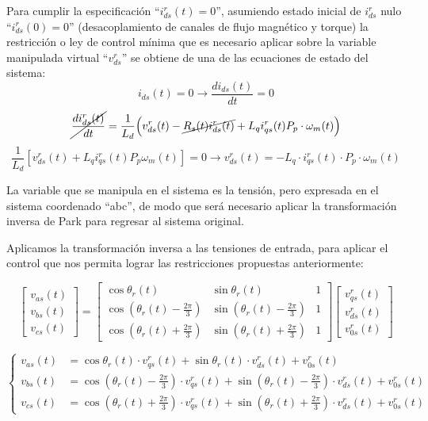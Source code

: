 \documentclass{article}
\begin{document}
Para cumplir la especificación ``$i^r_{ds}(t) = 0$'', asumiendo estado inicial de \(i^r_{ds}\) nulo ``$i^r_{ds}(0) = 0$'' (desacoplamiento de canales de flujo magnético y torque) la restricción o ley de control mínima que es necesario aplicar sobre la variable manipulada virtual ``$v^r_{ds}$'' se obtiene de una de las ecuaciones de estado del sistema:
\begin{equation}
i_{ds}(t) =  0 \rightarrow \frac{di_{ds}(t)}{dt} = 0
\end{equation}
\begin{equation}
\cancel{\frac{d i_{ds}^r(t)}{dt}} = \frac{1}{L_d} \Big( v_{ds}^r(t) - \cancel{R_s(t) i_{ds}^r(t)} + L_q i_{qs}^r(t) P_p \cdot \omega_m(t) \Big)
\label{eq:ExpresionIds}
\end{equation}
\begin{equation}
\frac{1}{L_d}\left[v^r_{ds}(t) + L_qi^r_{qs}(t)P_p\omega_m(t)\right] = 0 \rightarrow v^r_{ds}(t) = -L_q\cdot i^r_{qs}(t)\cdot P_p\cdot\omega_m(t)
\end{equation}

La variable que se manipula en el sistema es la tensión, pero expresada en el sistema coordenado ``abc'', de modo que será necesario aplicar la transformación inversa de Park para regresar al sistema original.

Aplicamos la transformación inversa a las tensiones de entrada, para aplicar el control que nos permita lograr las restricciones propuestas anteriormente:

\begin{equation}
\begin{bmatrix}
v_{as}(t) \\
v_{bs}(t) \\
v_{cs}(t)
\end{bmatrix} = 
\begin{bmatrix}
\cos \theta_r(t) & \sin \theta_r(t) & 1 \\
\cos(\theta_r(t)-\frac{2\pi}{3}) & \sin(\theta_r(t)-\frac{2\pi}{3}) & 1 \\
\cos(\theta_r(t)+\frac{2\pi}{3}) & \sin(\theta_r(t)+\frac{2\pi}{3}) & 1
\end{bmatrix}
\begin{bmatrix}
v^r_{qs}(t) \\
v^r_{ds}(t) \\
v^r_{0s}(t)
\end{bmatrix}
\label{Ec.37}
\end{equation}

\begin{equation}
\begin{cases}
v_{as}(t) &= \cos \theta_r(t)\cdot v^r_{qs}(t) + \sin \theta_r(t)\cdot v^r_{ds}(t) + v^r_{0s}(t) \\
v_{bs}(t) &= \cos\left(\theta_r(t)-\frac{2\pi}{3}\right)\cdot v^r_{qs}(t) + \sin\left(\theta_r(t)-\frac{2\pi}{3}\right)\cdot v^r_{ds}(t) + v^r_{0s}(t) \\
v_{cs}(t) &= \cos\left(\theta_r(t)+\frac{2\pi}{3}\right)\cdot v^r_{qs}(t) + \sin\left(\theta_r(t)+\frac{2\pi}{3}\right)\cdot v^r_{ds}(t) + v^r_{0s}(t)
\end{cases}
\end{equation}
\end{document}
